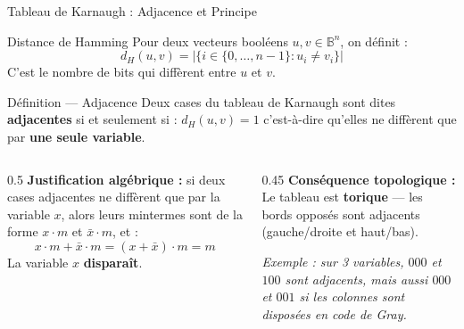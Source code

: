 \begin{frame}{Tableau de Karnaugh : Adjacence et Principe}

    \begin{block}{Distance de Hamming}
        Pour deux vecteurs booléens \(u, v \in \mathbb{B}^n\), on définit :
        \[
            d_H(u,v) = \big|\{ i \in \{0,\dots,n-1\} : u_i \neq v_i \}\big|
        \]
        C'est le nombre de bits qui diffèrent entre \(u\) et \(v\).
    \end{block}

    \vspace{0.3cm}

    \begin{alertblock}{Définition — Adjacence}
        Deux cases du tableau de Karnaugh sont dites \textbf{adjacentes} si et seulement si : $d_H(u, v) = 1$
        c'est-à-dire qu'elles ne diffèrent que par \textbf{une seule variable}.
    \end{alertblock}

    \vspace{0.3cm}

    \begin{columns}[T]
        \begin{column}{0.5\textwidth}
            \textbf{Justification algébrique :} si deux cases adjacentes ne diffèrent que par la variable \(x\), alors leurs mintermes sont de la forme \(x \cdot m\) et \(\bar{x} \cdot m\), et :
            \[
                x \cdot m + \bar{x} \cdot m = (x + \bar{x}) \cdot m = m
            \]
            La variable \(x\) \textbf{disparaît}.
        \end{column}
        \begin{column}{0.45\textwidth}
            \textbf{Conséquence topologique :}\\
            Le tableau est \textbf{torique} — les bords opposés sont adjacents (gauche/droite et haut/bas).

            \vspace{0.2cm}
            \textit{Exemple : sur 3 variables, \(000\) et \(100\) sont adjacents, mais aussi \(000\) et \(001\) si les colonnes sont disposées en code de Gray.}
        \end{column}
    \end{columns}

\end{frame}

